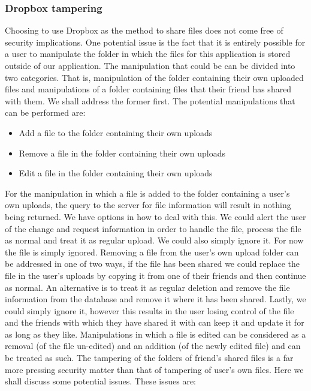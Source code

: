 \documentclass[12pt, titlepage]{article}
\begin{document}
\subsubsection{Dropbox tampering}
Choosing to use Dropbox as the method to share files does not come free of security implications. One potential issue is the fact that it is entirely possible for a user to manipulate the folder in which the files for this application is stored outside of our application. The manipulation that could be can be divided into two categories. That is, manipulation of the folder containing their own uploaded files and manipulations of a folder containing files that their friend has shared with them. We shall address the former first. The potential manipulations that can be performed are:
\begin{itemize}
	\item Add a file to the folder containing their own uploads
	\item Remove a file in the folder containing their own uploads
	\item Edit a file in the folder containing their own uploads
\end{itemize}
For the manipulation in which a file is added to the folder containing a user's own uploads, the query to the server for file information will result in nothing being returned. We have options in how to deal with this. We could alert the user of the change and request information in order to handle the file, process the file as normal and treat it as regular upload. We could also simply ignore it. For now the file is simply ignored.
\newline \indent Removing a file from the user's own upload folder can be addressed in one of two ways, if the file has been shared we could replace the file in the user's uploads by copying it from one of their friends and then continue as normal. An alternative is to treat it as regular deletion and remove the file information from the database and remove it where it has been shared. Lastly, we could simply ignore it, however this results in the user losing control of the file and the friends with which they have shared it with can keep it and update it for as long as they like.
\newline \indent Manipulations in which a file is edited can be considered as a removal (of the file un-edited) and an addition (of the newly edited file) and can be treated as such.
\newline
\newline \indent The tampering of the folders of friend's shared files is a far more pressing security matter than that of tampering of user's own files. Here we shall discuss some potential issues. These issues are:
\end{document}
